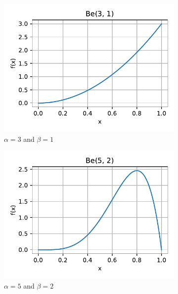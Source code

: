 \begin{figure}[H]
    \begin{subfigure}{0.3\textwidth}
        \centering
        \includegraphics[width=1\textwidth]{resources/figures/q1-beta_distr-alpha_3-beta_1.pdf}
        \caption{$\alpha = 3$ and $\beta = 1$}
        \label{q1-beta-distr-a_3-b_1}
    \end{subfigure}
    \hfill
    \begin{subfigure}{0.3\textwidth}
        \centering
        \includegraphics[width=1\textwidth]{resources/figures/q1-beta_distr-alpha_5-beta_2.pdf}
        \caption{$\alpha = 5$ and $\beta = 2$}
        \label{q1-beta-distr-a_5-b_2}
    \end{subfigure}
    \hfill
    \begin{subfigure}{0.3\textwidth}

\end{subfigure}
\end{figure}
